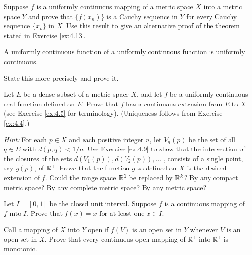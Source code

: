 \begin{myexercise}
    \label{ex:4.11}
    Suppose $f$ is a uniformly continuous mapping of a metric space $X$ into a metric space $Y$ and prove that $\{f(x_n)\}$ is a Cauchy sequence in $Y$ for every Cauchy sequence $\{x_n\}$ in $X$. 
    Use this result to give an alternative proof of the theorem stated in Exercise \ref{ex:4.13}.
\end{myexercise}


\begin{myexercise}
    \label{ex:4.12}
    A uniformly continuous function of a uniformly continuous function is uniformly continuous.
    
    State this more precisely and prove it.
\end{myexercise}


\begin{myexercise}
    \label{ex:4.13}
    Let $E$ be a dense subset of a metric space $X$, 
    and let $f$ be a uniformly continuous real function defined on $E$.
    Prove that $f$ has a continuous extension from $E$ to $X$
    (see Exercise \ref{ex:4.5} for terminology). 
    (Uniqueness follows from Exercise \ref{ex:4.4}.) 
    
    \emph{Hint:} For each $p \in X$ and each positive integer $n$, 
    let $V_n(p)$ be the set of all $q \in E$ with $d(p, q) < 1/n$. 
    Use Exercise \ref{ex:4.9} to show that the intersection of the closures of the sets $d(V_1(p)), d(V_2(p)), ...$ , 
    consists of a single point, say $g(p)$, of ${\protect\mathbb R}^1$. 
    Prove that the function $g$ so defined on $X$ is the desired extension of $f$.
    Could the range space ${\protect\mathbb R}^1$ be replaced by ${\protect\mathbb R}^k$? 
    By any compact metric space?
    By any complete metric space? 
    By any metric space?
\end{myexercise}


\begin{myexercise}
    \label{ex:4.14}
    Let $I = [0, 1]$ be the closed unit interval. 
    Suppose $f$ is a continuous mapping of $f$ into $I$. 
    Prove that $f(x) = x$ for at least one $x \in I$.
\end{myexercise}


\begin{myexercise}
    \label{ex:4.15}
    Call a mapping of $X$ into $Y$ open 
    if $f(V)$ is an open set in $Y$ whenever $V$ is an open set in $X$.
    Prove that every continuous open mapping of ${\protect\mathbb R}^1$ into ${\protect\mathbb R}^1$ is monotonic.
\end{myexercise}



